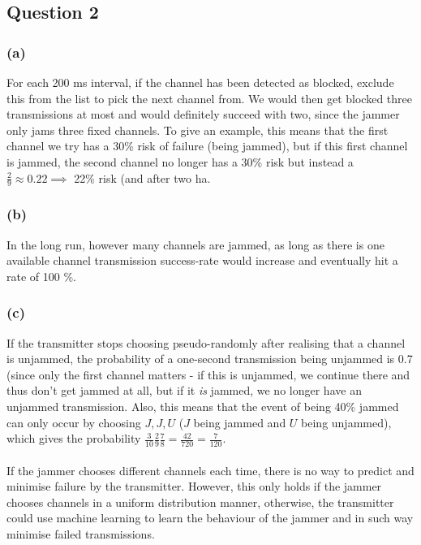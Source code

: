 \documentclass{article}
\begin{document}
\subsection*{Question 2}

\subsubsection*{(a)}

For each 200 ms interval, if the channel has been detected as blocked, exclude this from the list to pick the next channel from.
We would then get blocked three transmissions at most and would definitely succeed with two, since the jammer only jams three fixed channels. To give an example, this means that the first channel we try has a 30\% risk of failure (being jammed), but if this first channel is jammed, the second channel no longer has a 30\% risk but instead a $\frac{2}{9} \approx 0.22 \implies$ 22\% risk (and after two ha.

\subsubsection*{(b)}

In the long run, however many channels are jammed, as long as there is one available channel transmission success-rate would increase and eventually hit a rate of 100 \%.

\subsubsection*{(c)}

If the transmitter stops choosing pseudo-randomly after realising that a channel is unjammed, the probability of a one-second transmission being unjammed is 0.7 (since only the first channel matters - if this is unjammed, we continue there and thus don't get jammed at all, but if it \textit{is} jammed, we no longer have an unjammed transmission. Also, this means that the event of being 40\% jammed can only occur by choosing $J, J, U$ ($J$ being jammed and $U$ being unjammed), which gives the probability $\frac{3}{10} \frac{2}{9} \frac{7}{8} = \frac{42}{720} = \frac{7}{120}$.
\\
\\
If the jammer chooses different channels each time, there is no way to predict and minimise failure by the transmitter.
However, this only holds if the jammer chooses channels in a uniform distribution manner, otherwise, the transmitter could use machine learning to learn the behaviour of the jammer and in such way minimise failed transmissions.
\end{document}
